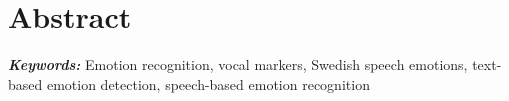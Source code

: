 \newpage
\chapter*{Abstract}
{}

\lipsum[1]

\vspace{0.6cm}
{

{\parindent=0cm\Large\textit{\textbf{Keywords:}}}
Emotion recognition, vocal markers, Swedish speech emotions, text-based emotion detection, speech-based emotion recognition 

\vspace{0.3cm}


}